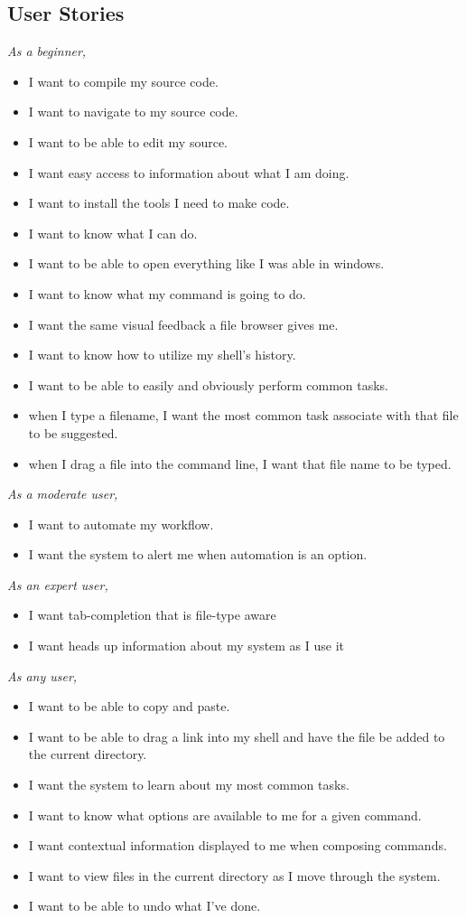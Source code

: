 \subsection{User Stories}
\emph{As a beginner, }
\begin{itemize}
  \item I want to compile my source code.
  \item I want to navigate to my source code.
  \item I want to be able to edit my source.
  \item I want easy access to information about what I am doing.
  \item I want to install the tools I need to make code.
  \item I want to know what I can do.
  \item I want to be able to open everything like I was able in windows.
  \item I want to know what my command is going to do.
  \item I want the same visual feedback a file browser gives me.
  \item I want to know how to utilize my shell’s history.
  \item I want to be able to easily and obviously perform common tasks.
  \item when I type a filename, I want the most common task associate with that file to be suggested.
  \item when I drag a file into the command line, I want that file name to be typed.
\end{itemize}

\emph{As a moderate user, }
\begin{itemize}
  \item I want to automate my workflow.
  \item I want the system to alert me when automation is an option.
\end{itemize}

\emph{As an expert user, }
\begin{itemize}
  \item I want tab-completion that is file-type aware
  \item I want heads up information about my system as I use it
\end{itemize}

\emph{As any user, }
\begin{itemize}
  \item I want to be able to copy and paste.
  \item I want to be able to drag a link into my shell and have the file be
    added to the current directory.
  \item I want the system to learn about my most common tasks.
  \item I want to know what options are available to me for a given command.
  \item I want contextual information displayed to me when composing commands.
  \item I want to view files in the current directory as I move through the
    system.
  \item I want to be able to undo what I've done.
\end{itemize}

